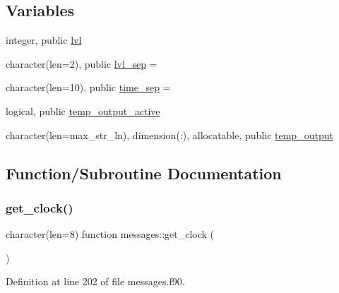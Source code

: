 \subsection*{Variables}
\begin{DoxyCompactItemize}
\item 
integer, public \hyperlink{namespacemessages_a36521a46e57da1d3be83019abdff132e}{lvl}
\item 
character(len=2), public \hyperlink{namespacemessages_ab1101c3acf2edc71877d4aa71aa3d931}{lvl\+\_\+sep} = \textquotesingle{}\textquotesingle{}
\item 
character(len=10), public \hyperlink{namespacemessages_abeb2abf0ac1d1fb4f09d881eb57b3dae}{time\+\_\+sep} = \textquotesingle{}\textquotesingle{}
\item 
logical, public \hyperlink{namespacemessages_ace8877914cfa5253cc002da0f387446a}{temp\+\_\+output\+\_\+active}
\item 
character(len=max\+\_\+str\+\_\+ln), dimension(\+:), allocatable, public \hyperlink{namespacemessages_a07070e72f15146af24816c39eea17088}{temp\+\_\+output}
\end{DoxyCompactItemize}


\subsection{Function/\+Subroutine Documentation}
\mbox{\label{namespacemessages_a61fd0b51b5e37d58fdc993c01792a3fd}} 
\subsubsection{\texorpdfstring{get\+\_\+clock()}{get\_clock()}}
{\footnotesize\ttfamily character(len=8) function messages\+::get\+\_\+clock (\begin{DoxyParamCaption}{ }\end{DoxyParamCaption})}



Definition at line 202 of file messages.\+f90.

